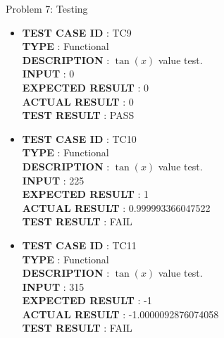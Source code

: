 \documentclass[a4paper,12pt]{article}
\begin{document}
\begin{section}{Problem 7: Testing}
\begin{itemize}
\item \textbf{TEST CASE ID} \hspace{1.25cm} : TC9  \\
\textbf{TYPE } \hspace{3.15cm}  : Functional\\
\textbf{DESCRIPTION }\hspace{1.25cm} : $\tan(x)$ value test. \\
\textbf{INPUT} \hspace{3.05cm} :  0 \\
\textbf{EXPECTED RESULT} \hspace{0.01cm} : 0 \\
\textbf{ACTUAL RESULT} \hspace{0.6cm} : 0 \\
\textbf{TEST RESULT} \hspace{1.40cm} : PASS \\	

\item \textbf{TEST CASE ID} \hspace{1.25cm} : TC10 \\
\textbf{TYPE } \hspace{3.15cm}  : Functional\\
\textbf{DESCRIPTION }\hspace{1.25cm} : $\tan(x)$ value test. \\
\textbf{INPUT} \hspace{3.05cm} :  225 \\
\textbf{EXPECTED RESULT} \hspace{0.01cm} : 1 \\
\textbf{ACTUAL RESULT} \hspace{0.6cm} : 0.999993366047522 \\
\textbf{TEST RESULT} \hspace{1.40cm} : FAIL \\


\item \textbf{TEST CASE ID} \hspace{1.25cm} : TC11  \\
\textbf{TYPE } \hspace{3.15cm}  : Functional\\
\textbf{DESCRIPTION }\hspace{1.25cm} : $\tan(x)$ value test. \\
\textbf{INPUT} \hspace{3.05cm} :  315 \\
\textbf{EXPECTED RESULT} \hspace{0.01cm} : -1 \\
\textbf{ACTUAL RESULT} \hspace{0.6cm} : -1.0000092876074058 \\
\textbf{TEST RESULT} \hspace{1.40cm} : FAIL \\




\end{itemize}
\end{section}
\end{document}
